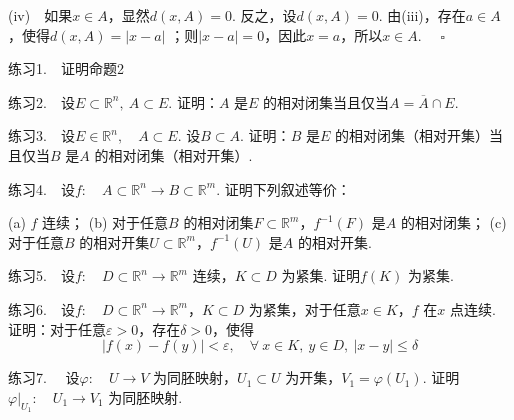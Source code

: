 \documentclass{article}
\begin{document}
(iv)\ \ 如果\(x \in A\)，显然\(d(x,A) = 0\). 反之，设\(d(x,A) = 0\). 由(iii)，存在\(a \in A\)，使得\(d(x,A) = | x - a | \) ；则\(| x - a |= 0 \)，因此\(x = a\)，所以\(x \in A\). \(\quad \square\)

\newpage

练习1.\ \ 证明命题2

\vspace{10pt}

练习2.\ \ 设\(E \subset \mathbb{R}^n,\ A \subset E\). 证明：\(A\) 是\(E\) 的相对闭集当且仅当\(A = \overline{A}\cap E\).

\vspace{10pt}

练习3.\ \ 设\(E \in \mathbb{R}^n,\quad A \subset E\). 设\(B \subset A\). 证明：\(B\) 是\(E\) 的相对闭集（相对开集）当且仅当\(B\) 是\(A\) 的相对闭集（相对开集）.

\vspace{10pt}

练习4.\ \ 设\(f: \quad A \subset \mathbb{R}^n \to B \subset \mathbb{R}^{m}\). 证明下列叙述等价：

(a) \(f\) 连续；\newline
(b) 对于任意\(B\) 的相对闭集\(F \subset \mathbb{R}^{m}\)，\(f^{-1}(F) \) 是\(A\) 的相对闭集；\newline
(c) 对于任意\(B\) 的相对开集\(U \subset \mathbb{R}^{m}\)，\(f^{-1}(U) \) 是\(A\) 的相对开集.


\vspace{10pt}

练习5.\ \ 设\(f:\quad D \subset \mathbb{R}^n \to \mathbb{R}^{m}\) 连续，\(K \subset D\) 为紧集. 证明\(f(K)\) 为紧集.

\vspace{10pt}

练习6.\ \ 设\(f:\quad D \subset \mathbb{R}^n \to \mathbb{R}^{m}\)，\(K \subset D\) 为紧集，对于任意\(x \in K\)，\(f\) 在\(x\) 点连续. 证明：对于任意\(\varepsilon > 0\)，存在\(\delta > 0\)，使得
\begin{equation*}
    | f(x) - f(y)  |< \varepsilon ,\quad \forall\ x \in K,\ y \in D,\ | x - y | \le \delta
\end{equation*}

\vspace{10pt}

练习7. \ \ 设\(\varphi :\quad U \to V\) 为同胚映射，\(U_1 \subset U\) 为开集，\(V_1 = \varphi (U_1)\). 证明\(\varphi |_{U_1}:\quad U_1 \to V_1\) 为同胚映射.

\vspace{10pt}
\end{document}
